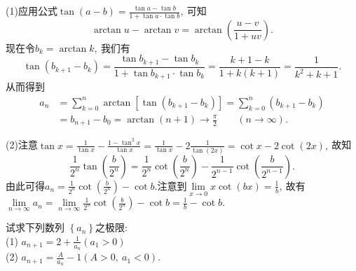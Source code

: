 	\begin{solution}
		(1)应用公式$\tan(a-b)=\frac{\tan a- \tan b}{1+\tan a\cdot \tan b},\ $可知
		$$\arctan u-\arctan v =\arctan\left(\frac{u-v}{1+uv}\right).$$
		现在令$b_k=\arctan k,\ $我们有
		$$\tan(b_{k+1}-b_k)=\frac{\tan b_{k+1}-\tan b_k}{1+\tan b_{k+1}\cdot\tan b_k}=\frac{k+1-k}{1+k(k+1)}=\frac{1}{k^2+k+1}.$$
		从而得到
		\begin{align*}
			a_n&=\sum\limits_{k=0}^{n}\arctan\left[\tan(b_{k+1}-b_k)\right]=\sum\limits_{k=0}^{n}(b_{k+1}-b_k)\\
			&=b_{n+1}-b_0=\arctan(n+1)\rightarrow\frac{\pi}{2}\qquad(n\rightarrow\infty).
		\end{align*}
		
		(2)注意$\tan x=\frac{1}{\tan x}-\frac{1-\tan ^2x}{\tan x}=\frac{1}{\tan x}-2\frac{1}{\tan (2x)}=\cot x-2\cot(2x),\ $故知
		$$\frac{1}{2^n}\tan\left(\frac{b}{2^n}\right)=\frac{1}{2^n}\cot\left(\frac{b}{2^n}\right)-\frac{1}{2^{n-1}}\cot\left(\frac{b}{2^{n-1}}\right).$$
		由此可得$a_n=\frac{1}{2^n}\cot\left(\frac{b}{2^n}\right)-\cot b.$注意到$\lim\limits_{x\rightarrow0}x\cot (bx)=\frac{1}{b},\ $故有$\lim\limits_{n\rightarrow\infty}a_n=\lim\limits_{n\rightarrow\infty}\frac{1}{2^n}\cot\left(\frac{b}{2^n}\right)-\cot b=\frac{1}{b}-\cot b.$ 
	\end{solution}
	\newpage
	\begin{problem}
		试求下列数列  $\left\{a_{n}\right\}  $之极限:\\
		(1) $ a_{n+1}=2+\frac{1}{a_{n}}\left(a_{1}>0\right)$\\
		(2) $ a_{n+1}=\frac{A}{a_{n}}-1\left(A>0,\  a_{1}<0\right) .$
	\end{problem}
	
